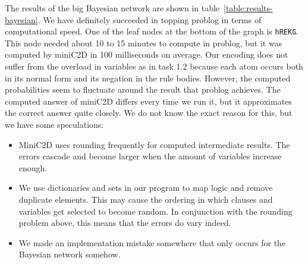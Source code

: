The results of the big Bayesian network are shown in table~\ref{table:results-bayesian}. We have definitely succeeded in topping problog in terms of computational speed. One of the leaf nodes at the bottom of the graph is \texttt{hREKG}. This node needed about 10 to 15 minutes to compute in problog, but it was computed by miniC2D in 100 milliseconds on average. Our encoding does not suffer from the overload in variables as in task 1.2 because each atom occurs both in its normal form and its negation in the rule bodies. However, the computed probabilities seem to fluctuate around the result that problog achieves. The computed answer of miniC2D differs every time we run it, but it approximates the correct answer quite closely. We do not know the exact reason for this, but we have some speculations:
\begin{itemize}
\item MiniC2D uses rounding frequently for computed intermediate results. The errors cascade and become larger when the amount of variables increase enough.
\item We use dictionaries and sets in our program to map logic and remove duplicate elements. This may cause the ordering in which clauses and variables get selected to become random. In conjunction with the rounding problem above, this means that the errors do vary indeed.
\item We made an implementation mistake somewhere that only occurs for the Bayesian network somehow.
\end{itemize}

